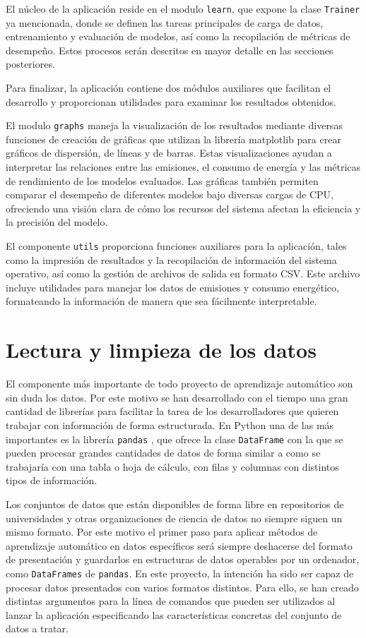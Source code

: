 El núcleo de la aplicación reside en el modulo \texttt{learn}, que expone la clase \texttt{Trainer} ya mencionada, donde se definen las tareas principales de carga de datos, entrenamiento y evaluación de modelos, así como la recopilación de métricas de desempeño. Estos procesos serán descritos en mayor detalle en las secciones posteriores.

Para finalizar, la aplicación contiene dos módulos auxiliares que facilitan el desarrollo y proporcionan utilidades para examinar los resultados obtenidos.

El modulo \texttt{graphs} maneja la visualización de los resultados mediante diversas funciones de creación de gráficas que utilizan la librería matplotlib para crear gráficos de dispersión, de líneas y de barras. Estas visualizaciones ayudan a interpretar las relaciones entre las emisiones, el consumo de energía y las métricas de rendimiento de los modelos evaluados. Las gráficas también permiten comparar el desempeño de diferentes modelos bajo diversas cargas de CPU, ofreciendo una visión clara de cómo los recursos del sistema afectan la eficiencia y la precisión del modelo.

El componente \texttt{utils} proporciona funciones auxiliares para la aplicación, tales como la impresión de resultados y la recopilación de información del sistema operativo, así como la gestión de archivos de salida en formato CSV. Este archivo incluye utilidades para manejar los datos de emisiones y consumo energético, formateando la información de manera que sea fácilmente interpretable. 


\section{Lectura y limpieza de los datos}
\label{sec:limpieza}

El componente más importante de todo proyecto de aprendizaje automático son sin duda los datos. Por este motivo se han desarrollado con el tiempo una gran cantidad de librerías para facilitar la tarea de los desarrolladores que quieren trabajar con información de forma estructurada. En Python una de las más importantes es la librería \texttt{pandas} \cite{pandas}, que ofrece la clase \texttt{DataFrame} con la que se pueden procesar grandes cantidades de datos de forma similar a como se trabajaría con una tabla o hoja de cálculo, con filas y columnas con distintos tipos de información.

Los conjuntos de datos que están disponibles de forma libre en repositorios de universidades y otras organizaciones de ciencia de datos no siempre siguen un mismo formato. Por este motivo el primer paso para aplicar métodos de aprendizaje automático en datos específicos será siempre deshacerse del formato de presentación y guardarlos en estructuras de datos operables por un ordenador, como \texttt{DataFrames} de \texttt{pandas}. En este proyecto, la intención ha sido ser capaz de procesar datos presentados con varios formatos distintos. Para ello, se han creado distintas argumentos para la línea de comandos que pueden ser utilizados al lanzar la aplicación especificando las características concretas del conjunto de datos a tratar.

